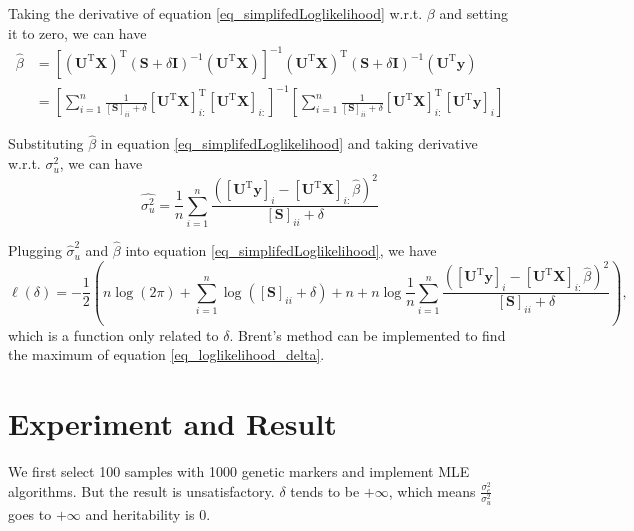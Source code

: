 \documentclass{article}
\begin{document}
Taking the derivative of equation \ref{eq_simplifedLoglikelihood} w.r.t. $ \beta $ and setting it to zero, we can have
\begin{align}\label{eq_beta}
	\hat{\beta} &= [(\mathbf{U}^{\mathrm{T}}\mathbf{X})^{\mathrm{T}} (\mathbf{S} + \delta \mathbf{I})^{-1} (\mathbf{U}^{\mathrm{T}}\mathbf{X})]^{-1}  (\mathbf{U}^{\mathrm{T}}\mathbf{X})^{\mathrm{T}} (\mathbf{S} + \delta \mathbf{I})^{-1} (\mathbf{U}^{\mathrm{T}}\mathbf{y})\\
	&= \left[ \sum_{i=1}^{n} \frac{1}{[\mathbf{S}]_{ii} + \delta} [\mathbf{U}^{\mathrm{T}}\mathbf{X}]_{i:}^{\mathrm{T}} [\mathbf{U}^{\mathrm{T}}\mathbf{X}]_{i:}\right]^{-1} \left[ \sum_{i=1}^{n} \frac{1}{[\mathbf{S}]_{ii} + \delta} [\mathbf{U}^{\mathrm{T}}\mathbf{X}]_{i:}^{\mathrm{T}} [\mathbf{U}^{\mathrm{T}}\mathbf{y}]_{i}\right]
\end{align}

Substituting $ \hat{\beta} $ in equation \ref{eq_simplifedLoglikelihood} and taking derivative w.r.t. $ \sigma^{2}_{u} $, we can have
\begin{equation}\label{eq_sigma_u}
	\hat{\sigma^{2}_{u}} = \frac{1}{n} \sum_{i=1}^{n} \frac{([\mathbf{U}^{\mathrm{T}}\mathbf{y}]_{i} - [\mathbf{U}^{\mathrm{T}}\mathbf{X}]_{i:}\hat{\beta})^{2}}{[\mathbf{S}]_{ii} + \delta}
\end{equation}

Plugging $ \hat{\sigma}^{2}_{u} $ and $ \hat{\beta} $ into equation \ref{eq_simplifedLoglikelihood}, we have
\begin{equation}\label{eq_loglikelihood_delta}
	\ell(\delta) = -\frac{1}{2} \left( n\log(2\pi) + \sum_{i=1}^{n}\log([\mathbf{S}]_{ii} + \delta)+ n + n\log \frac{1}{n} \sum_{i=1}^{n} \frac{([\mathbf{U}^{\mathrm{T}}\mathbf{y}]_{i} - [\mathbf{U}^{\mathrm{T}}\mathbf{X}]_{i:}\hat{\beta})^{2}}{[\mathbf{S}]_{ii} + \delta} \right),
\end{equation}
which is a function only related to $ \delta $. Brent's method can be implemented to find the maximum of equation \ref{eq_loglikelihood_delta}.

\section{Experiment and Result}

We first select 100 samples with 1000 genetic markers and implement MLE algorithms. But the result is unsatisfactory. $ \delta $ tends to be $ + \infty $, which means $ \frac{\sigma^{2}_{e}}{\sigma^{2}_{u}} $ goes to $ + \infty $ and heritability is $ 0 $. 


\end{document}
